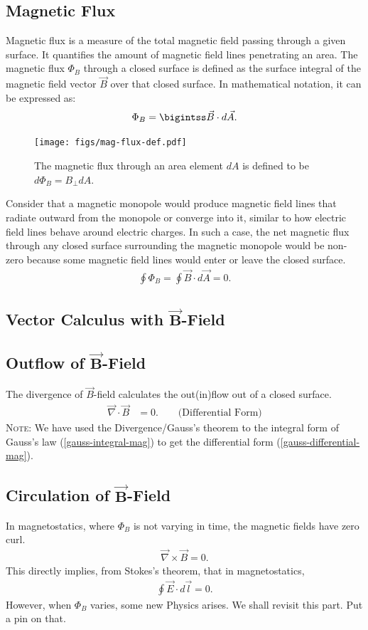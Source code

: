 \documentclass[12pt,b4paper]{article}
\begin{document}
\subsection{Magnetic Flux}
Magnetic flux is a measure of the total magnetic field passing through a given surface. It quantifies the amount of magnetic field lines penetrating an area. The magnetic flux $\Phi_B$ through a closed surface is defined as the surface integral of the magnetic field vector $\vec{B}$ over that closed surface. In mathematical notation, it can be expressed as:
\begin{align}
    \Phi_B=\bigintss\vec{B}\cdot d\vec{A}.\label{gauss-integral-mag}
\end{align}
\begin{figure}[H]
    \centering
    \texttt{[image: figs/mag-flux-def.pdf]}
    \caption{The magnetic flux through an area element $dA$ is defined to be $d\Phi_B = B_\perp dA$.}
    \label{fig:mag-field-flux}
\end{figure}
Consider that a magnetic monopole would produce magnetic field lines that radiate outward from the monopole or converge into it, similar to how electric field lines behave around electric charges. In such a case, the net magnetic flux through any closed surface surrounding the magnetic monopole would be non-zero because some magnetic field lines would enter or leave the closed surface.
\begin{align}
    \oint\Phi_B=\oint \vec{B}\cdot d\vec{A}=0.
\end{align}
\subsection{Vector Calculus with $\boldsymbol{\vec{B}}$-Field}
\subsection*{Outflow of $\boldsymbol{\vec{B}}$-Field}
The divergence of $\vec{B}$-field calculates the out(in)flow out of a closed surface.
\begin{align}
    \vec{\nabla}\cdot\vec{B} &= 0.\qquad\text{(Differential Form)}\label{gauss-differential-mag}
\end{align}
\textsc{Note}: We have used the Divergence/Gauss's theorem to the integral form of Gauss's law (\ref{gauss-integral-mag}) to get the differential form (\ref{gauss-differential-mag}).
\subsection*{Circulation of $\boldsymbol{\vec{B}}$-Field}
In magnetostatics, where $\Phi_B$ is not varying in time, the magnetic fields have zero curl.
\begin{align}
    \vec{\nabla}\times\vec{B}=0.
\end{align}
This directly implies, from Stokes's theorem, that in magnetostatics,
\begin{align}
    \oint \vec{E}\cdot d\vec{l}=0.
\end{align}
However, when $\Phi_B$ varies, some new Physics arises. We shall revisit this part. Put a pin on that.
\end{document}
